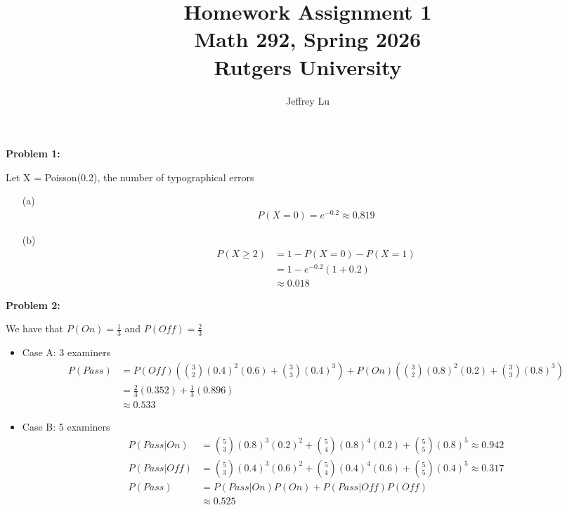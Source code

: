 \documentclass[12pt]{article}
\title{Homework Assignment 1 \\ \large Math 292, Spring 2026 \\ Rutgers University}
\author{Jeffrey Lu}
\begin{document}
\maketitle

\noindent \textbf{Problem 1:}

Let X = Poisson(0.2), the number of typographical errors
\begin{itemize}
    \item [(a)]
          \begin{align*}
              P(X=0) = e^{-0.2} \approx{0.819}
          \end{align*}
    \item [(b)]
          \begin{align*}
              P(X\geq{2}) & = 1 - P(X=0) - P(X=1)   \\
                          & = 1 - e^{-0.2}(1 + 0.2) \\
                          & \approx{0.018}
          \end{align*}
\end{itemize}

\noindent \textbf{Problem 2:}

We have that $P(On) = \frac{1}{3}$ and $P(Off) = \frac{2}{3}$

\begin{itemize}
    \item Case A: 3 examiners
          \begin{align*}
              P(Pass) & = P(Off) (\binom{3}{2}(0.4)^2(0.6) + \binom{3}{3}(0.4)^3) + P(On) (\binom{3}{2}(0.8)^2(0.2) + \binom{3}{3}(0.8)^3) \\
                      & = \frac{2}{3} (0.352) + \frac{1}{3} (0.896)                                                                        \\
                      & \approx{0.533}
          \end{align*}

    \item Case B: 5 examiners
          \begin{align*}
              P(Pass | On)  & = \binom{5}{3}(0.8)^3(0.2)^2 + \binom{5}{4}(0.8)^4(0.2) + \binom{5}{5}(0.8)^5  \approx {0.942} \\
              P(Pass | Off) & = \binom{5}{3}(0.4)^3(0.6)^2 + \binom{5}{4}(0.4)^4(0.6) + \binom{5}{5}(0.4)^5 \approx {0.317}  \\
              P(Pass)       & = P(Pass | On) P(On) + P(Pass | Off) P(Off)                                                    \\
                            & \approx{0.525}
          \end{align*}
\end{itemize}
\end{document}
